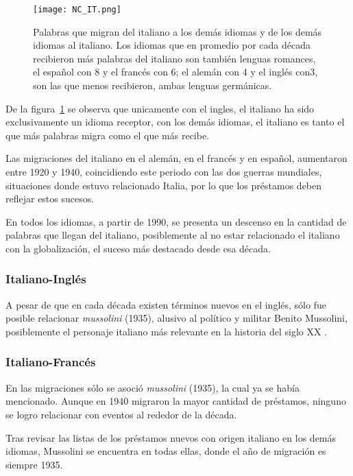  
\begin{figure}[h!]
	\centering
	\texttt{[image: NC\_IT.png]}
	\caption{Palabras que migran del italiano a los demás idiomas y de los demás idiomas al italiano. Los idiomas que en promedio por cada década recibieron más palabras del italiano son también lenguas romances, el español con 8 y el francés con 6; el alemán con 4 y el inglés con3, son las que menos recibieron, ambas lenguas germánicas.} 
	\label{fig.NC_IT}
\end{figure}

De la figura~\ref{fig.NC_IT} se observa que unicamente con el ingles, el italiano ha sido exclusivamente un idioma receptor,  con los demás idiomas,  el italiano es tanto el que más palabras migra como el que más recibe. 

Las migraciones del italiano en el alemán, en el francés y en español, aumentaron  entre 1920 y 1940,  coincidiendo este periodo con las dos guerras mundiales, situaciones donde estuvo relacionado Italia, por lo que los préstamos deben reflejar estos sucesos. 

En todos los idiomas,  a partir de 1990, se presenta un descenso en la cantidad de palabras que llegan del italiano, posiblemente al no estar relacionado el italiano con la globalización, el suceso más destacado desde esa década.   

\subsubsection*{Italiano-Inglés}%

A pesar de que en cada década existen términos nuevos en el inglés, sólo fue posible relacionar \textit{mussolini} (1935),  alusivo al político y militar Benito Mussolini,  posiblemente el personaje italiano más relevante en la historia del siglo XX .

\subsubsection*{Italiano-Francés}%



En las migraciones sólo se asoció \textit{mussolini} (1935), la cual ya se había mencionado. Aunque en 1940 migraron la mayor cantidad de préstamos, ninguno se logro relacionar con eventos al rededor de la década. 

Tras revisar las listas de los préstamos nuevos con origen italiano  en los demás idiomas, Mussolini se encuentra en todas ellas, donde el año de migración es siempre 1935.






